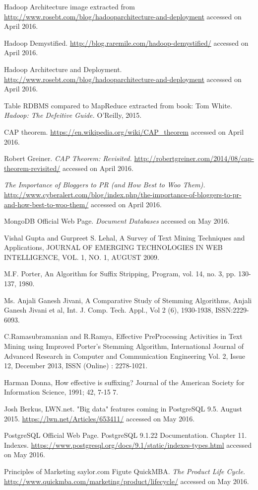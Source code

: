 \begin{thebibliography}{99999}
 Hadoop Architecture image extracted from \url{http://www.rosebt.com/blog/hadooparchitecture-and-deployment} accessed on April 2016.

 Hadoop Demystified. \url{http://blog.raremile.com/hadoop-demystified/} accessed on April 2016.

 Hadoop Architecture and Deployment. \url{http://www.rosebt.com/blog/hadooparchitecture-and-deployment} accessed on April 2016.

 Table RDBMS compared to MapReduce extracted from book: Tom White. \textit{Hadoop: The Defeitive Guide.} O'Reilly, 2015.

 CAP theorem. \url{https://en.wikipedia.org/wiki/CAP_theorem} accessed on April 2016.

 Robert Greiner. \textit{CAP Theorem: Revisited.} \url{http://robertgreiner.com/2014/08/cap-theorem-revisited/} accessed on April 2016.

\textit{The Importance of Bloggers to PR (and How Best to Woo Them).} \url{http://www.cyberalert.com/blog/index.php/the-importance-of-bloggers-to-pr-and-how-best-to-woo-them/} accessed on April 2016.

 MongoDB Official Web Page. \textit{Document Databases} accessed on May 2016.

 Vishal Gupta and Gurpreet S. Lehal, A Survey of Text Mining Techniques and Applications, JOURNAL OF EMERGING TECHNOLOGIES IN WEB INTELLIGENCE, VOL. 1, NO. 1, AUGUST 2009. 

  M.F. Porter, An Algorithm for Suffix Stripping, Program, vol. 14, no. 3, pp. 130-137, 1980.

 Ms. Anjali Ganesh Jivani, A Comparative Study of Stemming Algorithms, Anjali Ganesh Jivani et al, Int. J. Comp. Tech. Appl., Vol 2 (6), 1930-1938, ISSN:2229-6093.

 C.Ramasubramanian and R.Ramya, Effective PreProcessing Activities in Text Mining using Improved Porter's Stemming Algorithm, International Journal of Advanced Research in Computer and Communication Engineering Vol. 2, Issue 12, December 2013, ISSN (Online) : 2278-1021. 

 Harman Donna, How effective is suffixing?
Journal of the American Society for Information Science, 1991; 42, 7-15 7.

 Josh Berkus, LWN.net. "Big data" features coming in PostgreSQL 9.5. August 2015. \url{https://lwn.net/Articles/653411/} accessed on May 2016. 

 PostgreSQL Official Web Page. PostgreSQL 9.1.22 Documentation. Chapter 11. Indexes. \url{https://www.postgresql.org/docs/9.1/static/indexes-types.html} accessed on May 2016.

 Principles of Marketing saylor.com
 Figute 
 QuickMBA. \textit{The Product Life Cycle.} \url{http://www.quickmba.com/marketing/product/lifecycle/} accessed on May 2016.

\end{thebibliography}
